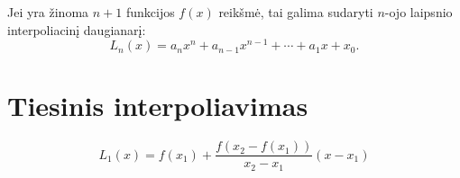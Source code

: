 


Jei yra žinoma $n+1$ funkcijos $f(x)$ reikšmė, tai galima sudaryti $n$-ojo
laipsnio interpoliacinį daugianarį:
\begin{equation*}
  L_{n}(x) = a_{n}x^{n} + a_{n-1}x^{n-1} + \cdots + a_{1}x + x_{0}.
\end{equation*}







\section{Tiesinis interpoliavimas}

\cite[158-163]{textbook}


\begin{defn}
  \begin{equation*}
    L_{1}(x) = f(x_{1}) + \frac{f(x_{2} - f(x_{1}))}{x_{2} - x_{1}}(x - x_{1})
  \end{equation*}
\end{defn}







